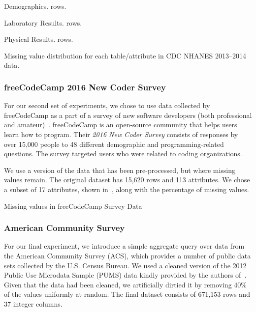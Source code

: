 \begin{table}
  \centering
  \begin{subtable}{0.5\textwidth}
    \centering
    
    \caption{Demographics. \demorows{} rows.}
  \end{subtable}
  \par\medskip
  \begin{subtable}{0.5\textwidth}
    \centering
    
    \caption{Laboratory Results. \labexrows{} rows.}
  \end{subtable}
  \par\medskip  
  \begin{subtable}{0.5\textwidth}
    \centering
    
    \caption{Physical Results. \labexrows{} rows.}
  \end{subtable}
  \par\medskip  
  \caption{Missing value distribution for each table/attribute in CDC NHANES 2013--2014 data.}\label{table:nhanes-description} 
\end{table}

\subsubsection{freeCodeCamp 2016 New Coder Survey}
For our second set of experiments, we chose to use data collected
by freeCodeCamp as a part of a survey of new software developers
(both professional and amateur)~\cite{fcc-data}. freeCodeCamp is an open-source
community that helps users learn how to program. Their \textit{2016 New Coder Survey} consists of responses by over 15,000 people to 48 different
demographic and programming-related questions.
The survey targeted users who were related to coding organizations.

We use a version of the data that has been pre-processed, but where missing values remain.
The original dataset has 15,620 rows and 113 attributes.
We chose a subset of 17 attributes, shown in~, along with the percentage of missing values.

\begin{table}
  \centering
  
  \caption{Missing values in freeCodeCamp Survey Data}\label{table:fcc-description} 
\end{table}

\subsubsection{American Community Survey}
For our final experiment, we introduce a simple aggregate query over data from the American Community Survey (ACS), which
provides a number of public data sets collected by the U.S. Census Bureau.
We used a cleaned version of the 2012 Public Use Microdata Sample (PUMS) data kindly provided by the authors of~\cite{akande2015empirical}.
Given that the data had been cleaned, we artificially dirtied it by removing 40\% of the values uniformly at random.
The final dataset consists of 671,153 rows and 37 integer columns.

